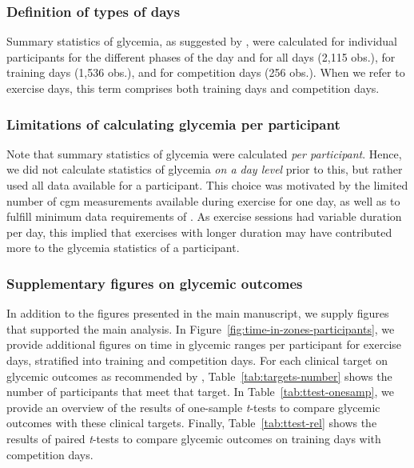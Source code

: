 \documentclass[11pt,a4paper]{article}
\begin{document}
\subsubsection{Definition of types of days}
Summary statistics of glycemia, as suggested by \citet{29162583}, were calculated for individual participants for the different phases of the day and for all days (2,115 obs.), for training days (1,536 obs.), and for competition days (256 obs.). When we refer to exercise days, this term comprises both training days and competition days. %

\subsubsection{Limitations of calculating glycemia per participant} Note that summary statistics of glycemia were calculated \textit{per participant}. Hence, we did not calculate statistics of glycemia \textit{on a day level} prior to this, but rather used all data available for a participant. This choice was motivated by the limited number of \gls{cgm} measurements available during exercise for one day, as well as to fulfill minimum data requirements of \citet{29162583}. As exercise sessions had variable duration per day, this implied that exercises with longer duration may have contributed more to the glycemia statistics of a participant. 

\subsubsection{Supplementary figures on glycemic outcomes} In addition to the figures presented in the main manuscript, we supply figures that supported the main analysis. %
In Figure~\ref{fig:time-in-zones-participants}, we provide additional figures on time in glycemic ranges per participant for exercise days, stratified into training and competition days. For each clinical target on glycemic outcomes as recommended by \citet{31177185}, Table~\ref{tab:targets-number} shows the number of participants that meet that target. In Table~\ref{tab:ttest-onesamp}, we provide an overview of the results of one-sample \textit{t}-tests to compare glycemic outcomes with these clinical targets. Finally, Table~\ref{tab:ttest-rel} shows the results of paired \textit{t}-tests to compare glycemic outcomes on training days with competition days.
\end{document}
